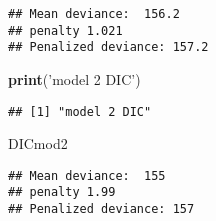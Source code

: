 \documentclass[]{article}
\newenvironment{Shaded}{\begin{snugshade}}{\end{snugshade}}
\newcommand{\KeywordTok}[1]{\textcolor[rgb]{0.13,0.29,0.53}{\textbf{#1}}}
\newcommand{\StringTok}[1]{\textcolor[rgb]{0.31,0.60,0.02}{#1}}
\newcommand{\NormalTok}[1]{#1}
\begin{document}
\begin{verbatim}
## Mean deviance:  156.2 
## penalty 1.021 
## Penalized deviance: 157.2
\end{verbatim}

\begin{Shaded}
\begin{Highlighting}[]
\KeywordTok{print}\NormalTok{(}\StringTok{'model 2 DIC'}\NormalTok{)}
\end{Highlighting}
\end{Shaded}

\begin{verbatim}
## [1] "model 2 DIC"
\end{verbatim}

\begin{Shaded}
\begin{Highlighting}[]
\NormalTok{DICmod2}
\end{Highlighting}
\end{Shaded}

\begin{verbatim}
## Mean deviance:  155 
## penalty 1.99 
## Penalized deviance: 157
\end{verbatim}
\end{document}
